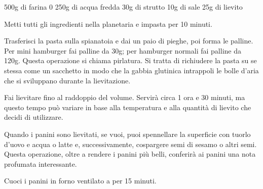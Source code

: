 \label{panini-hamburger}
\begin{ingreds}
	500g di farina 0  
	250g di acqua fredda
	30g di strutto 
	10g di sale
	25g di lievito
\end{ingreds}

\begin{method}
	Metti tutti gli ingredienti nella planetaria e impasta per 10 minuti.

	Trasferisci la pasta sulla spianatoia e dai un paio di pieghe, poi forma le palline. Per mini hamburger fai palline da 30g; per hamburger normali fai palline da 120g. Questa operazione si chiama pirlatura. Si tratta di richiudere la pasta su se stessa come un sacchetto in modo che la gabbia glutinica intrappoli le bolle d'aria che si sviluppano durante la lievitazione.

	Fai lievitare fino al raddoppio del volume. Servirà circa 1 ora e 30 minuti, ma questo tempo può variare in base alla temperatura e alla quantità di lievito che decidi di utilizzare.
	
	Quando i panini sono lievitati, se vuoi, puoi spennellare la superficie con tuorlo d'uovo e acqua o latte e, successivamente, cospargere semi di sesamo o altri semi. Questa operazione, oltre a rendere i panini più belli, conferirà ai panini una nota profumata interessante.

	Cuoci i panini in forno ventilato a  per 15 minuti.

\end{method}
